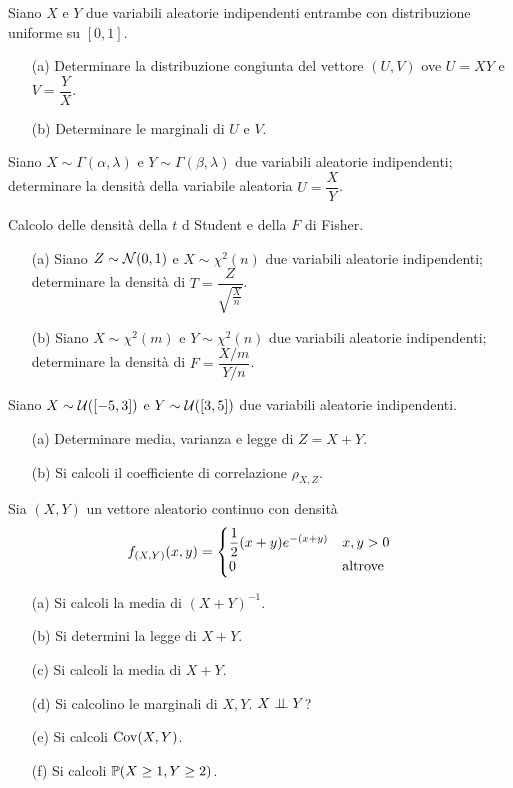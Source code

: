 \Esercizio{}
Siano $X$ e $Y$ due variabili aleatorie indipendenti entrambe con distribuzione uniforme su $[0,1]$.
\begin{enumerate}
\item [(a)] Determinare la distribuzione congiunta del vettore $(U,V)$ ove $U=XY$ e $V=\dfrac{Y}{X}$.
\item [(b)] Determinare le marginali di $U$ e $V$.
\end{enumerate}

\Esercizio{}
Siano $X\sim\Gamma(\alpha,\lambda)$ e $Y\sim\Gamma(\beta,\lambda)$ due variabili aleatorie indipendenti; determinare la densità della variabile aleatoria $U=\dfrac{X}{Y}$.

\Esercizio{} %
Calcolo delle densità della $t$ d Student e della $F$ di Fisher.
\begin{enumerate}
\item [(a)] Siano $Z\sim\mathcal{N}(0,1)$ e $X\sim\chi^2(n)$ due variabili aleatorie indipendenti; determinare la densità di $T=\dfrac{Z}{\sqrt{\frac{X}{n}}}$.
\item [(b)] Siano $X\sim\chi^2(m)$ e $Y\sim\chi^2(n)$ due variabili aleatorie indipendenti; determinare la densità di $F=\dfrac{X/m}{Y/n}$.
\end{enumerate}

\Esercizio{} %
Siano $X\sim\mathcal{U}([-5,3])$ e $Y\sim\mathcal{U}([3,5])$ due variabili aleatorie indipendenti.
\begin{enumerate}
\item [(a)] Determinare media, varianza e legge di $Z=X+Y$.
\item [(b)] Si calcoli il coefficiente di correlazione $\rho_{X,Z}$.
\end{enumerate}

\Esercizio{}
Sia $(X,Y)$ un vettore aleatorio continuo con densità
\[
f_{(X,Y)}(x,y)=\begin{cases} \dfrac{1}{2}(x+y)e^{-(x+y)} &x,y>0 \\ 0&\text{altrove} \end{cases}
\]
\begin{enumerate}
\item [(a)] Si calcoli la media di $(X+Y)^{-1}$.
\item [(b)] Si determini la legge di $X+Y$.
\item [(c)] Si calcoli la media di $X+Y$.
\item [(d)] Si calcolino le marginali di $X,Y$. $X\perp \!\!\! \perp Y$?
\item [(e)] Si calcoli $\operatorname{Cov}(X,Y)$.
\item [(f)] Si calcoli $\mathbb{P}(X\geq 1,Y\geq 2)$.
\end{enumerate}

